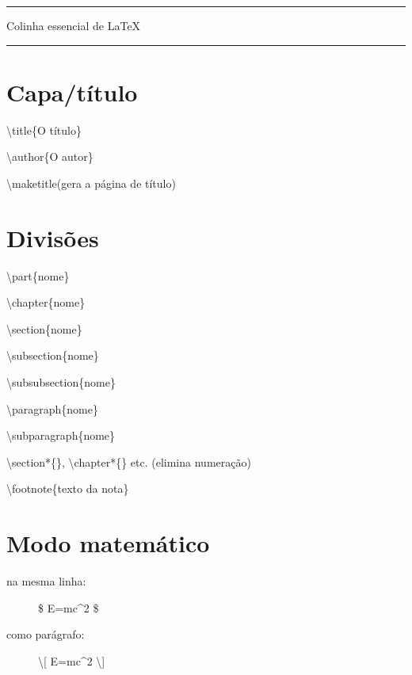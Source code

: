 \documentclass[11pt,twoside,english,brazilian]{article}
\begin{document}
{
  \centering
  \Large\bfseries

  \rule[.6ex]{.2\textwidth}{1pt}
  \quad\space Colinha essencial de \LaTeX \quad\space
  \rule[.6ex]{.2\textwidth}{1pt}\par
}

\setlength{\columnsep}{20pt}
\setlength{\columnseprule}{.2pt}
\begin{multicols}{3}

\section*{Capa/título}

\textbackslash{}title\{O título\}

\textbackslash{}author\{O autor\}

\textbackslash{}maketitle\quad (gera a página de título)


\section*{Divisões}

\textbackslash{}part\{nome\}

\textbackslash{}chapter\{nome\}

\textbackslash{}section\{nome\}

\textbackslash{}subsection\{nome\}

\textbackslash{}subsubsection\{nome\}

\textbackslash{}paragraph\{nome\}

\textbackslash{}subparagraph\{nome\}

\textbackslash{}section*\{\},
\textbackslash{}chapter*\{\} etc.\quad
(elimina numeração)


\vspace{\baselineskip}


\textbackslash{}footnote\{texto da nota\}


\section*{Modo matemático}

\begin{description}
  \item[na mesma linha:] \$ E=mc\^{}2 \$
  \item[como parágrafo:] \textbackslash[ E=mc\^{}2 \textbackslash]
\end{description}


\vspace{\baselineskip}



\end{multicols}
\end{document}
